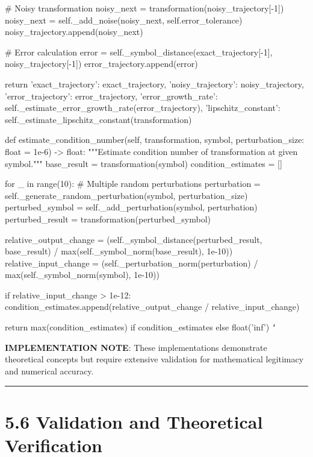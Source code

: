             \# Noisy transformation
            noisy_next = transformation(noisy_trajectory[-1])
            noisy_next = self._add_noise(noisy_next, self.error_tolerance)
            noisy_trajectory.append(noisy_next)
            
            \# Error calculation
            error = self._symbol_distance(exact_trajectory[-1], noisy_trajectory[-1])
            error_trajectory.append(error)
            
        return {
            'exact_trajectory': exact_trajectory,
            'noisy_trajectory': noisy_trajectory,
            'error_trajectory': error_trajectory,
            'error_growth_rate': self._estimate_error_growth_rate(error_trajectory),
            'lipschitz_constant': self._estimate_lipschitz_constant(transformation)
        }
        
    def estimate_condition_number(self, transformation, symbol, perturbation_size: float = 1e-6) -> float:
        """Estimate condition number of transformation at given symbol."""
        base_result = transformation(symbol)
        condition_estimates = []
        
        for _ in range(10):  \# Multiple random perturbations
            perturbation = self._generate_random_perturbation(symbol, perturbation_size)
            perturbed_symbol = self._add_perturbation(symbol, perturbation)
            perturbed_result = transformation(perturbed_symbol)
            
            relative_output_change = (self._symbol_distance(perturbed_result, base_result) / 
                                    max(self._symbol_norm(base_result), 1e-10))
            relative_input_change = (self._perturbation_norm(perturbation) / 
                                   max(self._symbol_norm(symbol), 1e-10))
            
            if relative_input_change > 1e-12:
                condition_estimates.append(relative_output_change / relative_input_change)
                
        return max(condition_estimates) if condition_estimates else float('inf')
\texttt{`}

\textbf{IMPLEMENTATION NOTE}: These implementations demonstrate theoretical concepts but require extensive validation for mathematical legitimacy and numerical accuracy.

\hrule

\section{5.6 Validation and Theoretical Verification}

